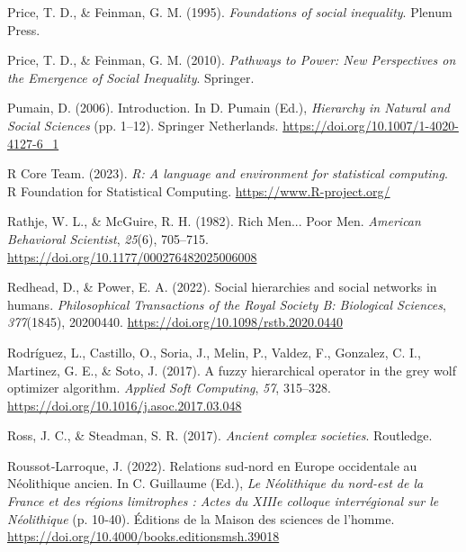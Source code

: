 \documentclass[
  12pt,
]{book}
\newlength{\cslhangindent}
\newlength{\cslentryspacingunit} %
\newenvironment{CSLReferences}[2] %
 {%
  \setlength{\parindent}{0pt}
  \ifodd #1
  \let\oldpar\par
  \def\par{\hangindent=\cslhangindent\oldpar}
  \fi
  \setlength{\parskip}{#2\cslentryspacingunit}
 }%
 {}
\begin{document}
\begin{CSLReferences}{1}{0}
\leavevmode{}%
Price, T. D., \& Feinman, G. M. (1995). \emph{Foundations of social inequality}. Plenum Press.

\leavevmode{}%
Price, T. D., \& Feinman, G. M. (2010). \emph{Pathways to Power: New Perspectives on the Emergence of Social Inequality}. Springer.

\leavevmode{}%
Pumain, D. (2006). Introduction. In D. Pumain (Ed.), \emph{Hierarchy in {Natural} and {Social Sciences}} (pp. 1--12). {Springer Netherlands}. \url{https://doi.org/10.1007/1-4020-4127-6_1}

\leavevmode{}%
R Core Team. (2023). \emph{R: A language and environment for statistical computing}. R Foundation for Statistical Computing. \url{https://www.R-project.org/}

\leavevmode{}%
Rathje, W. L., \& McGuire, R. H. (1982). Rich Men... Poor Men. \emph{American Behavioral Scientist}, \emph{25}(6), 705--715. \url{https://doi.org/10.1177/000276482025006008}

\leavevmode{}%
Redhead, D., \& Power, E. A. (2022). Social hierarchies and social networks in humans. \emph{Philosophical Transactions of the Royal Society B: Biological Sciences}, \emph{377}(1845), 20200440. \url{https://doi.org/10.1098/rstb.2020.0440}

\leavevmode{}%
Rodríguez, L., Castillo, O., Soria, J., Melin, P., Valdez, F., Gonzalez, C. I., Martinez, G. E., \& Soto, J. (2017). A fuzzy hierarchical operator in the grey wolf optimizer algorithm. \emph{Applied Soft Computing}, \emph{57}, 315--328. \url{https://doi.org/10.1016/j.asoc.2017.03.048}

\leavevmode{}%
Ross, J. C., \& Steadman, S. R. (2017). \emph{Ancient complex societies}. Routledge.

\leavevmode{}%
Roussot‑Larroque, J. (2022). Relations sud‑nord en Europe occidentale au Néolithique ancien. In C. Guillaume (Ed.), \emph{Le Néolithique du nord-est de la France et des régions limitrophes : Actes du XIIIe colloque interrégional sur le Néolithique} (p. 10‑40). {Éditions de la Maison des sciences de l'homme}. \url{https://doi.org/10.4000/books.editionsmsh.39018}


\end{CSLReferences}
\end{document}

